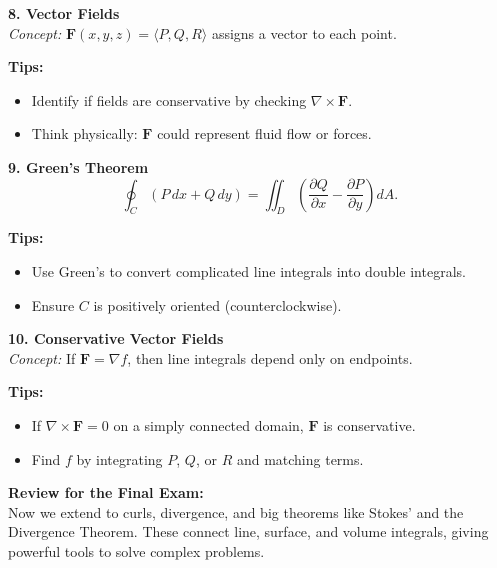 \documentclass[9pt]{article}
\begin{document}
\begin{multicols}{2}
\begin{tcolorbox}[title=, colframe=brightgreen]
\textbf{8. Vector Fields}\\
\textit{Concept:} $\mathbf{F}(x,y,z)=\langle P,Q,R\rangle$ assigns a vector to each point.

\textbf{Tips:}
\begin{itemize}
    \item Identify if fields are conservative by checking $\nabla \times \mathbf{F}$.
    \item Think physically: $\mathbf{F}$ could represent fluid flow or forces.
\end{itemize}
\end{tcolorbox}

\begin{tcolorbox}[title=, colframe=brightpink]
\textbf{9. Green's Theorem}\\
\[
\oint_{C} (P\,dx + Q\,dy) = \iint_{D}\left(\frac{\partial Q}{\partial x} - \frac{\partial P}{\partial y}\right)dA.
\]

\textbf{Tips:}
\begin{itemize}
    \item Use Green’s to convert complicated line integrals into double integrals.
    \item Ensure $C$ is positively oriented (counterclockwise).
\end{itemize}
\end{tcolorbox}

\begin{tcolorbox}[title=, colframe=brightyellow]
\textbf{10. Conservative Vector Fields}\\
\textit{Concept:} If $\mathbf{F}=\nabla f$, then line integrals depend only on endpoints.

\textbf{Tips:}
\begin{itemize}
    \item If $\nabla \times \mathbf{F}=0$ on a simply connected domain, $\mathbf{F}$ is conservative.
    \item Find $f$ by integrating $P$, $Q$, or $R$ and matching terms.
\end{itemize}
\end{tcolorbox}

\end{multicols}

\noindent \textbf{Review for the Final Exam:}\\
Now we extend to curls, divergence, and big theorems like Stokes’ and the Divergence Theorem. These connect line, surface, and volume integrals, giving powerful tools to solve complex problems.
\end{document}
